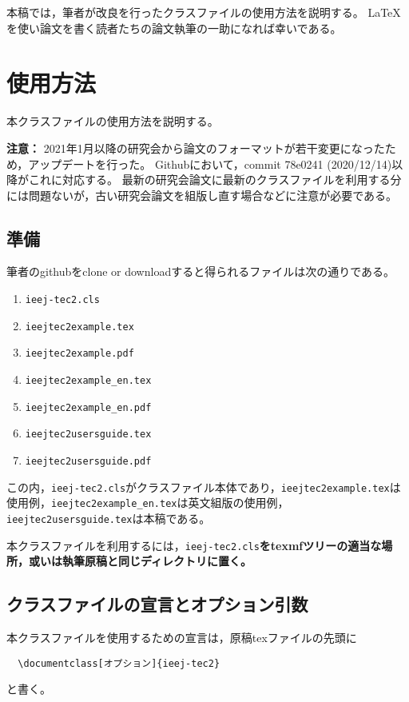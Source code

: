 \documentclass[fleqn]{ieej-tec2}%
\begin{document}
本稿では，筆者が改良を行ったクラスファイルの使用方法を説明する。
\LaTeX{}を使い論文を書く読者たちの論文執筆の一助になれば幸いである。

\section{使用方法}
本クラスファイルの使用方法を説明する。

\textbf{注意：} 2021年1月以降の研究会から論文のフォーマットが若干変更になった\cite{IEEJformat2021}ため，アップデートを行った。
Githubにおいて，commit 78e0241 (2020/12/14)以降がこれに対応する。
最新の研究会論文に最新のクラスファイルを利用する分には問題ないが，古い研究会論文を組版し直す場合などに注意が必要である。

\subsection{準備}
筆者のgithubをclone or downloadすると得られるファイルは次の通りである。
\begin{enumerate}
    \item \texttt{ieej-tec2.cls}
    \item \texttt{ieejtec2example.tex}
    \item \texttt{ieejtec2example.pdf}
    \item \texttt{ieejtec2example\_en.tex}
    \item \texttt{ieejtec2example\_en.pdf}
    \item \texttt{ieejtec2usersguide.tex}
    \item \texttt{ieejtec2usersguide.pdf}
\end{enumerate}
この内，\texttt{ieej-tec2.cls}がクラスファイル本体であり，\texttt{ieejtec2example.tex}は使用例，\texttt{ieejtec2example\_en.tex}は英文組版の使用例，\texttt{ieejtec2usersguide.tex}は本稿である。

本クラスファイルを利用するには，\texttt{ieej-tec2.cls}\textbf{をtexmfツリーの適当な場所，或いは執筆原稿と同じディレクトリに置く。}

\subsection{クラスファイルの宣言とオプション引数}
本クラスファイルを使用するための宣言は，原稿texファイルの先頭に
\begin{verbatim}
  \documentclass[オプション]{ieej-tec2}
\end{verbatim}
と書く。
\end{document}
